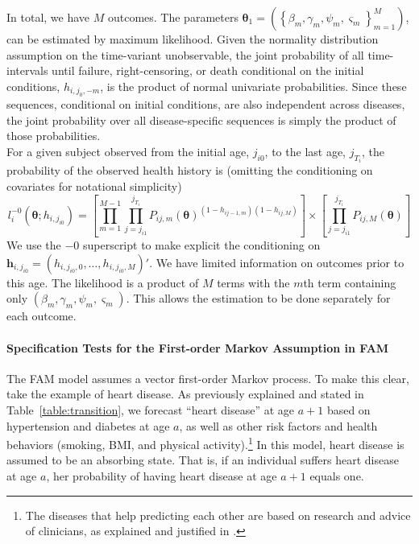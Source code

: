 \noindent In total, we have $M$ outcomes. The parameters
$\mathbf{\theta}_1 = \left(\left\{\beta_m, \gamma_m, \psi_m, \varsigma_m\right\}_{m=1}^M \right)$,
can be estimated by maximum likelihood. Given the normality distribution assumption on the
time-variant unobservable, the joint probability of all time-intervals until failure, right-censoring,
or death conditional on the initial conditions, $h_{i,j_0,-m}$, is the product of
normal univariate probabilities. Since these sequences, conditional on initial
conditions, are also independent across diseases, the joint
probability over all disease-specific sequences is simply the product of
those probabilities. \\

\noindent For a given subject observed from the initial age, $j_{i0}$, to the last age, $j_{T_i}$, the probability of the observed health history is
(omitting the conditioning on covariates for notational simplicity)
\begin{equation*}
	l^{-0}_i(\mathbf{\theta}; h_{i,j_{i0}}) = \left[\prod_{m=1}^{M-1} \prod_{j=j_{i1}}^{j_{T_i}} P_{ij,m}(\mathbf{\theta})^{(1-h_{ij-1,m})(1-h_{ij,M})} \right] \times \left[\prod_{j=j_{i1}}^{j_{T_i}} P_{ij,M}(\mathbf{\theta}) \right]
\end{equation*}
We use the ${-0}$ superscript to make explicit the conditioning on $\mathbf{h}_{i,j_{i0}} = (h_{i,j_{i0},0},\ldots,h_{i,j_{i0},M})'$. We have limited information on outcomes prior to this age.
The likelihood is a product of $M$ terms with the $m$th term containing only
$(\beta_m, \gamma_m, \psi_m, \varsigma_m)$. This allows the estimation
to be done separately for each outcome. \\

\paragraph{Specification Tests for the First-order Markov Assumption in FAM} \label{section:firstorder}

\noindent The FAM model assumes a vector first-order Markov process. To make this clear, take the example of heart disease. As previously explained and stated in Table~\ref{table:transition}, we forecast ``heart disease'' at age $a+1$ based on hypertension and diabetes at age $a$, as well as other risk factors and health behaviors (smoking, BMI, and physical activity).\footnote{The diseases that help predicting each other are based on research and advice of clinicians, as explained and justified in \citet{Goldman_etal_2015_Future-Elderly-Model-Report}.} In this model, heart disease is assumed to be an absorbing state. That is, if an individual suffers heart disease at age $a$, her probability of having heart disease at age $a+1$ equals one.\\

